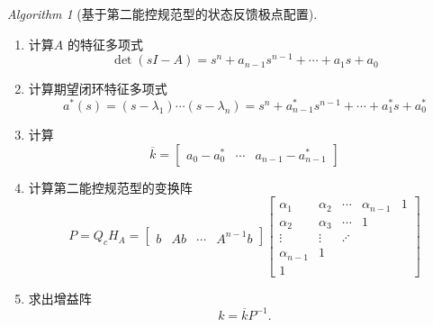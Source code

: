 \documentclass[14pt,a4paper]{article}
\theoremstyle{plain}
\theoremstyle{definition}
\theoremstyle{remark}
\theoremstyle{plain}
\theoremstyle{plain}
\theoremstyle{plain}
\theoremstyle{definition}
\theoremstyle{remark}
\newtheorem{alg}{Algorithm}[section]
\numberwithin{equation}{section}
\begin{document}
				\begin{alg}[基于第二能控规范型的状态反馈极点配置]  
				\label{alg:基于第二能控规范型的状态反馈极点配置}
					\ 
					\begin{enumerate}
						\item 计算$A$ 的特征多项式
							\[
							\mathop{\text{det}} \left( sI-A \right) = s^{n} + a_{n-1}s^{n-1}+ \cdots +a_1s+a_0
							\] 
						\item 计算期望闭环特征多项式
							\[
								a^*(s) = (s-\lambda_1)\cdots(s-\lambda_{n}) = s^{n} + a^*_{n-1}s^{n-1}+ \cdots +a^*_1s+a^*_0
							\] 
						\item 计算
							\[
							\overline{k} = \begin{bmatrix}
								a_0-a^*_0 & \cdots & a_{n-1}-a_{n-1}^* 
							\end{bmatrix} 
							\] 
						\item 计算第二能控规范型的变换阵
							\[
								P = Q_c H_A = \begin{bmatrix}
									b & Ab & \cdots & A^{n-1}b 
								\end{bmatrix} 
								\begin{bmatrix}
									\alpha_1 & \alpha_2 & \cdots &\alpha_{n-1} & 1 \\
									\alpha_2 & \alpha_3 & \cdots & 1\\
									\vdots & \vdots & \iddots\\
									\alpha_{n-1} & 1 \\
									1
								\end{bmatrix}
							\]
						\item 求出增益阵 
							\[
							k = \overline{k} P^{-1}
							.\] 
					\end{enumerate} 
				\end{alg} 
\end{document}
